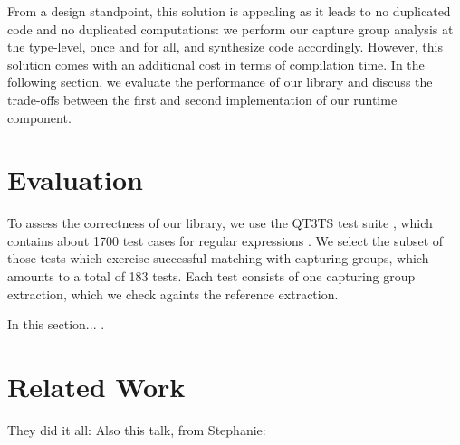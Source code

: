 From a design standpoint, this solution is appealing as it leads to no duplicated code and no duplicated computations: we perform our capture group analysis at the type-level, once and for all, and synthesize code accordingly.
However, this solution comes with an additional cost in terms of compilation time.
In the following section, we evaluate the performance of our library and discuss the trade-offs between the first and second implementation of our runtime component.

\section{Evaluation}

To assess the correctness of our library, we use the QT3TS test suite \citep{w3c1994xquery}, which contains about 1700 test cases for regular expressions \citep[perl-tests.xml]{w3c1994qt3ts}.
We select the subset of those tests which exercise successful matching with capturing groups, which amounts to a total of 183 tests.
Each test consists of one capturing group extraction, which we check againts the reference extraction.


In this section... .

\section{Related Work}

They did it all: \citep{spishak2012type}
Also this talk, from Stephanie: \citep{weirich2014examples}
